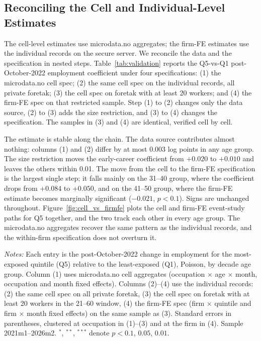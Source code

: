 \documentclass[12pt]{article}
\begin{document}
\subsection{Reconciling the Cell and Individual-Level Estimates}\label{sec:results:reconcile}

The cell-level estimates use microdata.no aggregates; the firm-FE estimates use the individual records on the secure server. We reconcile the data and the specification in nested steps. Table~\ref{tab:validation} reports the Q5-vs-Q1 post-October-2022 employment coefficient under four specifications: (1) the microdata.no cell spec; (2) the same cell spec on the individual records, all private foretak; (3) the cell spec on foretak with at least 20 workers; and (4) the firm-FE spec on that restricted sample. Step (1) to (2) changes only the data source, (2) to (3) adds the size restriction, and (3) to (4) changes the specification. The samples in (3) and (4) are identical, verified cell by cell.

The estimate is stable along the chain. The data source contributes almost nothing: columns (1) and (2) differ by at most 0.003 log points in any age group. The size restriction moves the early-career coefficient from $+0.020$ to $+0.010$ and leaves the others within 0.01. The move from the cell to the firm-FE specification is the largest single step; it falls mainly on the 31--40 group, where the coefficient drops from $+0.084$ to $+0.050$, and on the 41--50 group, where the firm-FE estimate becomes marginally significant ($-0.021$, $p<0.1$). Signs are unchanged throughout. Figure~\ref{fig:cell_vs_firmfe} plots the cell and firm-FE event-study paths for Q5 together, and the two track each other in every age group. The microdata.no aggregates recover the same pattern as the individual records, and the within-firm specification does not overturn it.

\begin{table}[tp]
  \centering
  \caption{Cell-vs-individual reconciliation: Q5-vs-Q1 employment effect across nested specifications, private sector.}
  \label{tab:validation}
  
  \begin{minipage}{\textwidth}\footnotesize\textit{Notes:} Each entry is the post-October-2022 change in employment for the most-exposed quintile (Q5) relative to the least-exposed (Q1), Poisson, by decade age group. Column (1) uses microdata.no cell aggregates (occupation $\times$ age $\times$ month, occupation and month fixed effects). Columns (2)--(4) use the individual records: (2) the same cell spec on all private foretak, (3) the cell spec on foretak with at least 20 workers in the 21--60 window, (4) the firm-FE spec (firm $\times$ quintile and firm $\times$ month fixed effects) on the same sample as (3). Standard errors in parentheses, clustered at occupation in (1)--(3) and at the firm in (4). Sample 2021m1--2026m2. $^{*}$, $^{**}$, $^{***}$ denote $p<0.1$, $0.05$, $0.01$.\end{minipage}
\end{table}
\end{document}
